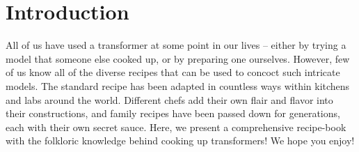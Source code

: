 %
\chapter{Introduction}
%

All of us have used a transformer at some point in our lives -- either by trying a model that someone else cooked up, or by preparing one ourselves. 
However, few of us know all of the diverse recipes that can be used to concoct such intricate models. 
The standard recipe \citep{vaswani-etal-2017-attention} has been adapted in countless ways within kitchens and labs around the world. 
Different chefs add their own flair and flavor into their constructions, and family recipes have been passed down for generations, each with their own secret sauce. 
Here, we present a comprehensive recipe-book with the folkloric knowledge behind cooking up transformers! 
We hope you enjoy!

